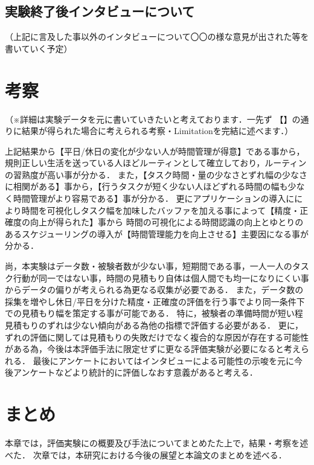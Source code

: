 \subsection{実験終了後インタビューについて}
（上記に言及した事以外のインタビューについて〇〇の様な意見が出された等を書いていく予定）
\section{考察}
（※詳細は実験データを元に書いていきたいと考えております．一先ず
【】の通りに結果が得られた場合に考えられる考察・Limitationを完結に述べます．）

上記結果から【平日/休日の変化が少ない人が時間管理が得意】である事から，規則正しい生活を送っている人ほどルーティンとして確立しており，ルーティンの習熟度が高い事が分かる．
また，【タスク時間・量の少なさとずれ幅の少なさに相関がある】事から，【行うタスクが短く少ない人ほどずれる時間の幅も少なく時間管理がより容易である】事が分かる．
更にアプリケーションの導入ににより時間を可視化しタスク幅を加味したバッファを加える事によって【精度・正確度の向上が得られた】事から
時間の可視化による時間認識の向上とゆとりのあるスケジューリングの導入が【時間管理能力を向上させる】主要因になる事が分かる．

尚，本実験はデータ数・被験者数が少ない事，短期間である事，一人一人のタスク行動が同一ではない事，時間の見積もり自体は個人間でも均一になりにくい事からデータの偏りが考えられる為更なる収集が必要である．
また，データ数の採集を増やし休日/平日を分けた精度・正確度の評価を行う事でより同一条件下での見積もり幅を策定する事が可能である．
特に，被験者の準備時間が短い程見積もりのずれは少ない傾向がある為他の指標で評価する必要がある．
更に，ずれの評価に関しては見積もりの失敗だけでなく複合的な原因が存在する可能性がある為，今後は本評価手法に限定せずに更なる評価実験が必要になると考えられる．
最後にアンケートにおいてはインタビューによる可能性の示唆を元に今後アンケートなどより統計的に評価しなおす意義があると考える．

\section{まとめ}
本章では，評価実験にの概要及び手法についてまとめたた上で，結果・考察を述べた．
次章では，本研究における今後の展望と本論文のまとめを述べる．
